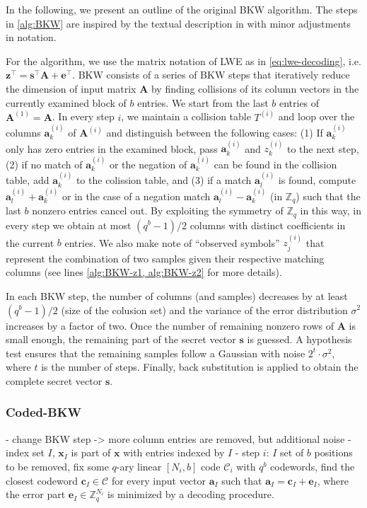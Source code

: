In the following, we present an outline of the original BKW algorithm. The steps in \cref{alg:BKW} are inspired by the textual description in \cite{GJS15} with minor adjustments in notation. 

For the algorithm, we use the matrix notation of LWE as in \cref{eq:lwe-decoding}, i.e. $\textbf{z}^\intercal = \textbf{s}^\intercal \textbf{A} + \textbf{e}^\intercal$. BKW consists of a series of BKW steps that iteratively reduce the dimension of input matrix $\textbf{A}$ by finding collisions of its column vectors in the currently examined block of $b$ entries. We start from the last $b$ entries of $\textbf{A}^{(1)} = \textbf{A}$. In every step $i$, we maintain a collision table $T^{(i)}$ and loop over the columns $\textbf{a}_k^{(i)}$ of $\textbf{A}^{(i)}$ and distinguish between the following cases: (1) If $\textbf{a}_k^{(i)}$ only has zero entries in the examined block, pass $\textbf{a}_k^{(i)}$ and $z_k^{(i)}$ to the next step, (2) if no match of $\textbf{a}_k^{(i)}$ or the negation of $\textbf{a}_k^{(i)}$ can be found in the collision table, add $\textbf{a}_k^{(i)}$ to the colission table, and (3) if a match $\textbf{a}_l^{(i)}$ is found, compute $\textbf{a}_l^{(i)} + \textbf{a}_k^{(i)}$ or in the case of a negation match $\textbf{a}_l^{(i)} - \textbf{a}_k^{(i)}$ (in $\mathbb{Z}_q$) such that the last $b$ nonzero entries cancel out. By exploiting the symmetry of $\mathbb{Z}_q$ in this way, in every step we obtain at most $(q^b - 1)/2$ columns with distinct coefficients in the current $b$ entries. We also make note of ``observed symbols'' $z_j^{(i)}$ that represent the combination of two samples given their respective matching columns (see lines \ref{alg:BKW-z1, alg:BKW-z2} for more details).

In each BKW step, the number of columns (and samples) decreases by at least $(q^b - 1)/2$ (size of the colusion set) and the variance of the error distribution $\sigma^2$ increases by a factor of two. Once the number of remaining nonzero rows of $\textbf{A}$ is small enough, the remaining part of the secret vector $\textbf{s}$ is guessed. A hypothesis test ensures that the remaining samples follow a Gaussian with noise $2^t\cdot \sigma^2$, where $t$ is the number of steps. Finally, back substitution is applied to obtain the complete secret vector $\textbf{s}$. %

\subsubsection*{Coded-BKW \cite{GJS15}}
- change BKW step -> more column entries are removed, but additional noise
- index set $I$, $\textbf{x}_I$ is part of $\textbf{x}$ with entries indexed by $I$
- step $i$: $I$ set of $b$ positions to be removed, fix some $q$-ary linear $\left[N_i, b\right]$ code $\mathcal{C}_i$ with $q^b$ codewords, find the closest codeword $\textbf{c}_I \in \mathcal{C}$ for every input vector $\textbf{a}_I$ such that $\textbf{a}_I = \textbf{c}_I + \textbf{e}_I$, where the error part $\textbf{e}_I \in \mathbb{Z}_q^{N_i}$ is minimized by a decoding procedure.

